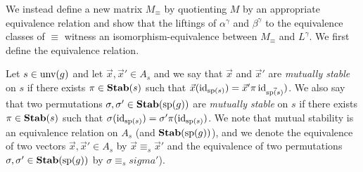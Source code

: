 \documentclass[../paper.tex]{subfiles}
\begin{document}
We instead define a new matrix $M_{\equiv}$ by quotienting $M$ by an appropriate
equivalence relation and show that the liftings of $\alpha^{\gamma}$ and
$\beta^{\gamma}$ to the equivalence classes of $\equiv$ witness an
isomorphism-equivalence between $M_\equiv$ and $L^{\gamma}$. We first define the
equivalence relation.

Let $s \in \text{unv}(g)$ and let $\vec{x}, \vec{x}' \in A_s$ and we say that
$\vec{x}$ and $\vec{x}'$ are \emph{mutually stable} on $s$ if there exists $\pi
\in \text{\textbf{Stab}}(s)$ such that $\vec{x} (\operatorname{id}_{\text{sp}(s)}) = \vec{x}'\pi
\operatorname{id}_{\vec{\text{sp}(s)}})$. We also say that two permutations $\sigma, \sigma' \in
\text{\textbf{Stab}} (\text{sp} (g))$ are \emph{mutually stable} on $s$ if there exists $\pi \in \text{\textbf{Stab}}(s)$
such that $\sigma (\operatorname{id}_{\text{sp}(s)}) = \sigma' \pi (\operatorname{id}_{\text{sp}(s)}) $. We note
that mutual stability is an equivalence relation on $A_s$ (and $\text{\textbf{Stab}} (\text{sp} (g))$),
and we denote the equivalence of two vectors $\vec{x}, \vec{x}' \in A_s$ by
$\vec{x} \equiv_s \vec{x}'$ and the equivalence of two permutations $\sigma,
\sigma' \in \text{\textbf{Stab}} (\text{sp} (g))$ by $\sigma \equiv_s sigma'$).





\end{document}
